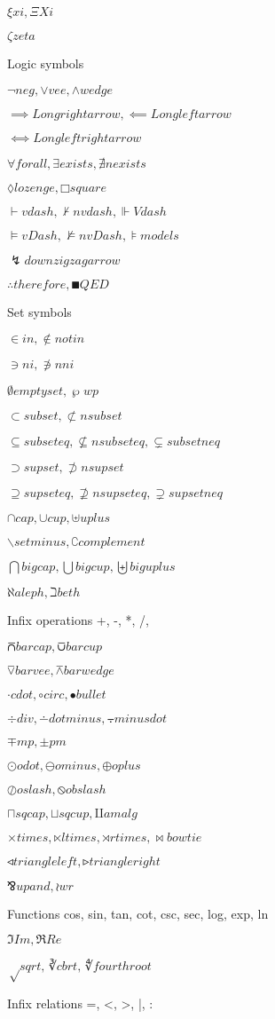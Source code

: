 \documentclass{article}
\begin{document}
$ξ xi, Ξ Xi$

$ζ zeta$

Logic symbols

$¬ neg, ∨ vee, ∧ wedge$

$⟹ Longrightarrow, ⟸ Longleftarrow$

$⟺ Longleftrightarrow$

$∀ forall, ∃ exists, ∄ nexists$

$◊ lozenge, □ square$

$⊢ vdash, ⊬ nvdash, ⊩ Vdash$

$⊨ vDash, ⊭ nvDash, ⊧ models$

$↯ downzigzagarrow$

$∴ therefore, ∎ QED$

Set symbols

$∈ in, ∉ notin$

$∋ ni, ∌ nni$

$∅ emptyset, ℘ wp$

$⊂ subset, ⊄ nsubset$

$⊆ subseteq, ⊈ nsubseteq, ⊊ subsetneq$

$⊃ supset, ⊅ nsupset$

$⊇ supseteq, ⊉ nsupseteq, ⊋ supsetneq$

$∩ cap, ∪ cup, ⊎ uplus$

$∖ setminus, ∁ complement$

$⋂ bigcap, ⋃ bigcup, ⨄ biguplus$

$ℵ aleph, ℶ beth$

Infix operations +, -, *, /, %

$⩃ barcap, ⩂ barcup$

$⊽ barvee, ⊼ barwedge$

$⋅ cdot, ∘ circ, • bullet$

$÷ div, ∸ dotminus, ⨪ minusdot$

$∓ mp, ± pm$

$⊙ odot, ⊖ ominus, ⊕ oplus$

$⊘ oslash, ⦸ obslash$

$⊓ sqcap, ⊔ sqcup, ⨿ amalg$

$× times, ⋉ ltimes, ⋊ rtimes, ⋈ bowtie$

$◃ triangleleft, ▹ triangleright$

$⅋ upand, ≀ wr$

Functions cos, sin, tan, cot, csc, sec, log, exp, ln

$ℑ Im, ℜ Re$

$√ sqrt, ∛ cbrt, ∜ fourthroot$

Infix relations =, <, >, |, :
\end{document}
